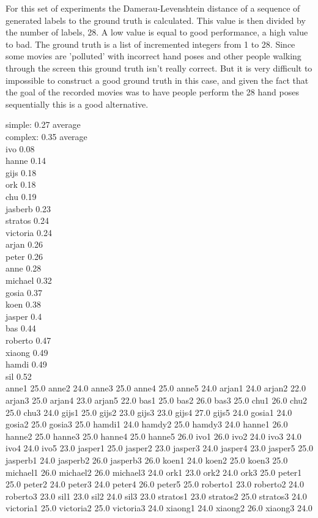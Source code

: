 For this set of experiments the Damerau-Levenshtein distance of a sequence of generated labels to the ground truth is calculated. This value is then divided by the number of labels, 28. A low value is equal to good performance, a high value to bad. The ground truth is a list of incremented integers from 1 to 28. Since some movies are 'polluted' with incorrect hand poses and other people walking through the screen this ground truth isn't really correct. But it is very difficult to impossible to construct a good ground truth in this case, and given the fact that the goal of the recorded movies was to have people perform the 28 hand poses sequentially this is a good alternative.

simple: 0.27 average\\
complex: 0.35 average\\

ivo 0.08\\
hanne 0.14\\
gijs 0.18\\
ork 0.18\\
chu 0.19\\
jasberb 0.23\\
stratos 0.24\\
victoria 0.24\\
arjan 0.26\\
peter 0.26\\
anne 0.28\\
michael 0.32\\
gosia 0.37\\
koen 0.38\\
jasper  0.4\\
bas 0.44\\
roberto 0.47\\
xiaong 0.49\\
hamdi 0.49\\
sil 0.52\\




anne1 25.0
anne2 24.0
anne3 25.0
anne4 25.0
anne5 24.0
arjan1 24.0
arjan2 22.0
arjan3 25.0
arjan4 23.0
arjan5 22.0
bas1 25.0
bas2 26.0
bas3 25.0
chu1 26.0
chu2 25.0
chu3 24.0
gijs1 25.0
gijs2 23.0
gijs3 23.0
gijs4 27.0
gijs5 24.0
gosia1 24.0
gosia2 25.0
gosia3 25.0
hamdi1 24.0
hamdy2 25.0
hamdy3 24.0
hanne1 26.0
hanne2 25.0
hanne3 25.0
hanne4 25.0
hanne5 26.0
ivo1 26.0
ivo2 24.0
ivo3 24.0
ivo4 24.0
ivo5 23.0
jasper1 25.0
jasper2 23.0
jasper3 24.0
jasper4 23.0
jasper5 25.0
jasperb1 24.0
jasperb2 26.0
jasperb3 26.0
koen1 24.0
koen2 25.0
koen3 25.0
michael1 26.0
michael2 26.0
michael3 24.0
ork1 23.0
ork2 24.0
ork3 25.0
peter1 25.0
peter2 24.0
peter3 24.0
peter4 26.0
peter5 25.0
roberto1 23.0
roberto2 24.0
roberto3 23.0
sil1 23.0
sil2 24.0
sil3 23.0
stratos1 23.0
stratos2 25.0
stratos3 24.0
victoria1 25.0
victoria2 25.0
victoria3 24.0
xiaong1 24.0
xiaong2 26.0
xiaong3 24.0

